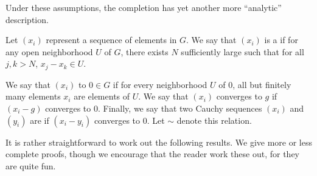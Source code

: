 Under these assumptions, the completion has yet another more 
``analytic'' description.

\begin{defn}
Let $(x_i)$ represent a sequence of elements in $G$. We say that
$(x_i)$ is a  if for
any open neighborhood $U$ of $G$, there exists $N$ sufficiently
large such that for all $j, k > N$, $x_j - x_k \in U$.

We say that $(x_i)$  
to $0 \in G$ if for every neighborhood $U$ of $0$, all but 
finitely many elements $x_i$ are elements of $U$. We say that
$(x_i)$ converges to $g$ if $(x_i - g)$ converges to $0$.
Finally, we say that two Cauchy sequences $(x_i)$ and $(y_i)$ are 
 if $(x_i - y_i)$
converges to $0$. Let $\sim$ denote this relation.
\end{defn}

It is rather straightforward to work out the following results.
We give more or less complete proofs, though we encourage that the 
reader work these out, for they are quite fun.

